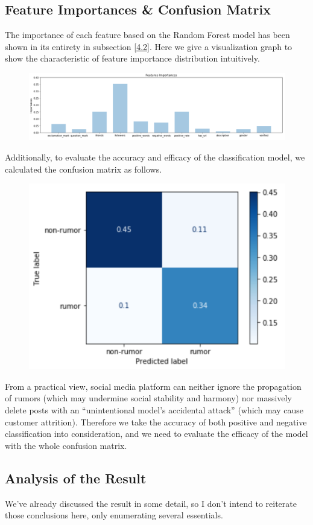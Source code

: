 \documentclass[12pt,a4paper]{article}
\begin{document}
\subsection{Feature Importances \& Confusion Matrix}
The importance of each feature based on the Random Forest model has been shown in its entirety in subsection \ref{4.2}. Here we give a visualization graph to show the characteristic of feature importance distribution intuitively. 

\begin{figure}[htbp]
	\centering
	\includegraphics[height=0.25\linewidth]{pic/importances}
\end{figure}

Additionally, to evaluate the accuracy and efficacy of the classification model, we calculated the confusion matrix as follows. 

\begin{figure}[htbp]
	\centering
	\includegraphics[height=0.4\linewidth]{pic/Evaluation_new}
\end{figure}

From a practical view, social media platform can neither ignore the propagation of rumors (which may undermine social stability and harmony) nor massively delete posts with an ``unintentional model's accidental attack'' (which may cause customer attrition). Therefore we take the accuracy of both positive and negative classification into consideration, and we need to evaluate the efficacy of the model with the whole confusion matrix. 


\subsection{Analysis of the Result}
We've already discussed the result in some detail, so I don't intend to reiterate those conclusions here, only enumerating several essentials. 
\end{document}
